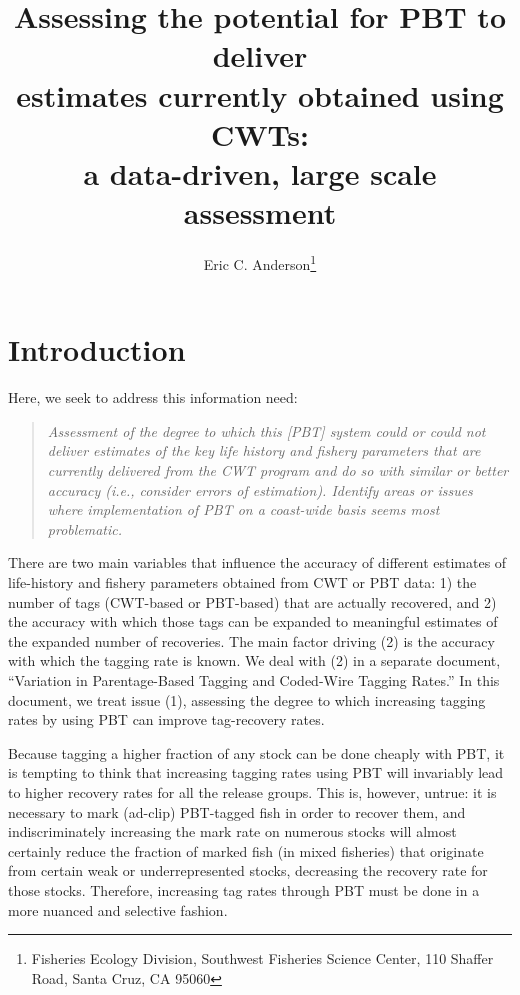 \documentclass[11pt]{article}
\title{Assessing the potential for PBT to deliver \\
estimates currently obtained using CWTs: \\
a data-driven, large scale assessment}
\author{Eric C. Anderson\thanks{
    Fisheries Ecology Division, 
    Southwest Fisheries Science Center, 
    110 Shaffer Road,
    Santa Cruz, CA 95060}
}
\begin{document}
\maketitle

\tableofcontents

\section{Introduction}
Here, we seek to address this information need:
\begin{quote}
{\sl Assessment of the degree to which this [PBT] system could or could not deliver estimates of the key life history and fishery parameters that are currently delivered from the CWT program and do so with similar or better accuracy (i.e., consider errors of estimation). Identify areas or issues where implementation of PBT on a coast-wide basis seems most problematic. }
\end{quote}

There are two main variables that influence the accuracy of different estimates of life-history and 
fishery parameters obtained from CWT or PBT data: 1) the number of tags (CWT-based or PBT-based) that 
are actually recovered, and 2) the accuracy with which those tags can be expanded to meaningful estimates
of the expanded number of recoveries.  The main factor driving (2) is the accuracy with
which the tagging rate is known.  We deal with (2) in a separate document, ``Variation in
Parentage-Based Tagging and Coded-Wire  Tagging  Rates.''  In this document, we treat issue (1), assessing
the degree to which increasing tagging rates by using  PBT can improve
tag-recovery rates.  

Because tagging a higher fraction of any stock can be done cheaply with PBT, it is tempting to
think that increasing tagging rates using PBT will invariably lead to higher recovery rates
for all the release groups.  This is, however, untrue: it is necessary to mark (ad-clip) PBT-tagged
fish in order to recover them, and indiscriminately increasing the mark rate on numerous stocks
will almost certainly reduce the fraction of marked fish (in mixed fisheries) that originate from
certain weak or underrepresented stocks, decreasing the recovery rate for those stocks.  Therefore, 
increasing tag rates through PBT must be done in a more nuanced and selective fashion.  
\end{document}
